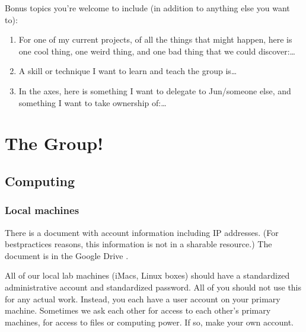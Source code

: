 \documentclass[letterpaper,10pt,english]{sphinxmanual}
\begin{document}
\sphinxAtStartPar
Bonus topics you’re welcome to include (in addition to anything else you want to):
\begin{enumerate}
%
\item {} 
\sphinxAtStartPar
For one of my current projects, of all the things that might happen, here is one cool thing, one weird thing, and one bad thing that we could discover:…

\item {} 
\sphinxAtStartPar
A skill or technique I want to learn and teach the group is…

\item {} 
\sphinxAtStartPar
In the  axes, here is something I want to delegate to Jun/someone else, and something I want to take ownership of:…

\end{enumerate}


\chapter{The Group!}
\label{\detokenize{05Group:the-group}}\label{\detokenize{05Group::doc}}

\section{Computing}
\label{\detokenize{05Group:computing}}

\subsection{Local  machines}
\label{\detokenize{05Group:local-machines}}
\sphinxAtStartPar
There is a document with account information including IP addresses. (For best\sphinxhyphen{}practices reasons, this information is not in a sharable resource.) The document is in the  Google Drive .

\sphinxAtStartPar
All of our local lab machines (iMacs, Linux boxes) should have a standardized administrative account and standardized password. All of you should not use this for any actual work. Instead, you each have a user account on your primary machine. Sometimes we ask each other for access to each other’s primary machines, for access to files or computing power. If so, make your own account.
\end{document}
